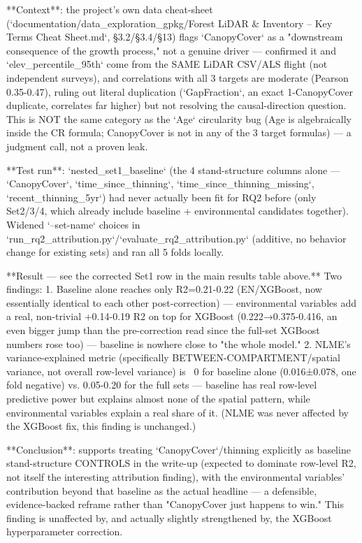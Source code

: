 **Context**: the project's own data cheat-sheet (`documentation/data_exploration_gpkg/Forest LiDAR
& Inventory – Key Terms Cheat Sheet.md`, §3.2/§3.4/§13) flags `CanopyCover` as a "downstream
consequence of the growth process," not a genuine driver — confirmed it and `elev_percentile_95th`
come from the SAME LiDAR CSV/ALS flight (not independent surveys), and correlations with all 3
targets are moderate (Pearson 0.35-0.47), ruling out literal duplication (`GapFraction`, an exact
1-CanopyCover duplicate, correlates far higher) but not resolving the causal-direction question.
This is NOT the same category as the `Age` circularity bug (Age is algebraically inside the CR
formula; CanopyCover is not in any of the 3 target formulas) — a judgment call, not a proven leak.

**Test run**: `nested_set1_baseline` (the 4 stand-structure columns alone — `CanopyCover`,
`time_since_thinning`, `time_since_thinning_missing`, `recent_thinning_5yr`) had never actually
been fit for RQ2 before (only Set2/3/4, which already include baseline + environmental candidates
together). Widened `--set-name` choices in `run_rq2_attribution.py`/`evaluate_rq2_attribution.py`
(additive, no behavior change for existing sets) and ran all 5 folds locally.

**Result — see the corrected Set1 row in the main results table above.** Two findings:
1. Baseline alone reaches only R2=0.21-0.22 (EN/XGBoost, now essentially identical to each other
   post-correction) — environmental variables add a real, non-trivial +0.14-0.19 R2 on top for
   XGBoost (0.222→0.375-0.416, an even bigger jump than the pre-correction read since the
   full-set XGBoost numbers rose too) — baseline is nowhere close to "the whole model."
2. NLME's variance-explained metric (specifically BETWEEN-COMPARTMENT/spatial variance, not
   overall row-level variance) is ~0 for baseline alone (0.016±0.078, one fold negative) vs.
   0.05-0.20 for the full sets — baseline has real row-level predictive power but explains almost
   none of the spatial pattern, while environmental variables explain a real share of it. (NLME
   was never affected by the XGBoost fix, this finding is unchanged.)

**Conclusion**: supports treating `CanopyCover`/thinning explicitly as baseline stand-structure
CONTROLS in the write-up (expected to dominate row-level R2, not itself the interesting
attribution finding), with the environmental variables' contribution beyond that baseline as the
actual headline — a defensible, evidence-backed reframe rather than "CanopyCover just happens to
win." This finding is unaffected by, and actually slightly strengthened by, the XGBoost
hyperparameter correction.

